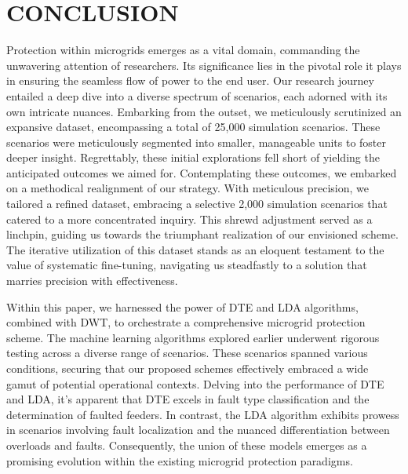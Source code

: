 \documentclass[8pt,a4paper,oneside]{elsarticle}
\begin{document}
\section{CONCLUSION} \label{CONCLOUSION}
Protection within microgrids emerges as a vital domain, commanding the unwavering attention of researchers. Its significance lies in the pivotal role it plays in ensuring the seamless flow of power to the end user. Our research journey entailed a deep dive into a diverse spectrum of scenarios, each adorned with its own intricate nuances. Embarking from the outset, we meticulously scrutinized an expansive dataset, encompassing a total of 25,000 simulation scenarios. These scenarios were meticulously segmented into smaller, manageable units to foster deeper insight. Regrettably, these initial explorations fell short of yielding the anticipated outcomes we aimed for. Contemplating these outcomes, we embarked on a methodical realignment of our strategy. With meticulous precision, we tailored a refined dataset, embracing a selective 2,000 simulation scenarios that catered to a more concentrated inquiry. This shrewd adjustment served as a linchpin, guiding us towards the triumphant realization of our envisioned scheme. The iterative utilization of this dataset stands as an eloquent testament to the value of systematic fine-tuning, navigating us steadfastly to a solution that marries precision with effectiveness.

Within this paper, we harnessed the power of DTE and LDA algorithms, combined with DWT, to orchestrate a comprehensive microgrid protection scheme. The machine learning algorithms explored earlier underwent rigorous testing across a diverse range of scenarios. These scenarios spanned various conditions, securing that our proposed schemes effectively embraced a wide gamut of potential operational contexts. Delving into the performance of DTE and LDA, it's apparent that DTE excels in fault type classification and the determination of faulted feeders. In contrast, the LDA algorithm exhibits prowess in scenarios involving fault localization and the nuanced differentiation between overloads and faults. Consequently, the union of these models emerges as a promising evolution within the existing microgrid protection paradigms.
\end{document}
